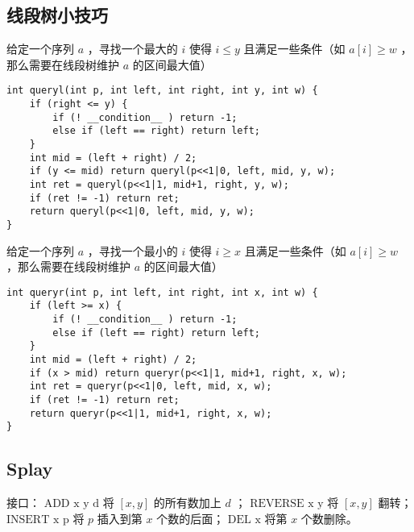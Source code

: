 \documentclass[landscape,a4paper]{article}
\begin{document}
\subsection{线段树小技巧}
给定一个序列 $a$ ，寻找一个最大的 $i$ 使得 $i \leq y$ 且满足一些条件（如 $a[i] \geq w$ ，那么需要在线段树维护 $a$ 的区间最大值）
\begin{lstlisting}
int queryl(int p, int left, int right, int y, int w) {
	if (right <= y) {
		if (! __condition__ ) return -1;
		else if (left == right) return left;
	}
	int mid = (left + right) / 2;
	if (y <= mid) return queryl(p<<1|0, left, mid, y, w);
	int ret = queryl(p<<1|1, mid+1, right, y, w);
	if (ret != -1) return ret;
	return queryl(p<<1|0, left, mid, y, w);
}
\end{lstlisting}
给定一个序列 $a$ ，寻找一个最小的 $i$ 使得 $i \geq x$ 且满足一些条件（如 $a[i] \geq w$ ，那么需要在线段树维护 $a$ 的区间最大值）
\begin{lstlisting}
int queryr(int p, int left, int right, int x, int w) {
	if (left >= x) {
		if (! __condition__ ) return -1;
		else if (left == right) return left;
	}
	int mid = (left + right) / 2;
	if (x > mid) return queryr(p<<1|1, mid+1, right, x, w);
	int ret = queryr(p<<1|0, left, mid, x, w);
	if (ret != -1) return ret;
	return queryr(p<<1|1, mid+1, right, x, w);
}
\end{lstlisting}
\subsection{Splay}

接口： 
 $\text{ADD x y d}$ 将 $[x, y]$ 的所有数加上 $d$ ；
 $\text{REVERSE x y}$  将 $[x, y]$ 翻转；
 $\text{INSERT x p}$ 将 $p$ 插入到第 $x$ 个数的后面；
 $\text{DEL x}$ 将第 $x$ 个数删除。
\end{document}
